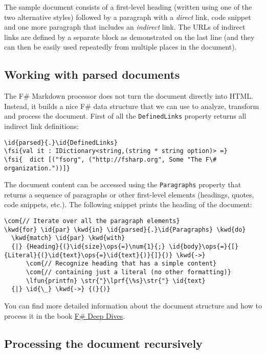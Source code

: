 \documentclass{article}
\newcommand{\id}[1]{\textcolor{black}{#1}}
\newcommand{\com}[1]{\textcolor{officegreen}{#1}}
\newcommand{\kwd}[1]{\textcolor{navy}{#1}}
\newcommand{\num}[1]{\textcolor{officegreen}{#1}}
\newcommand{\ops}[1]{\textcolor{purple}{#1}}
\newcommand{\str}[1]{\textcolor{olive}{#1}}
\newcommand{\fsi}[1]{\textcolor{outputcolor}{#1}}
\begin{document}
The sample document consists of a first-level heading (written using
one of the two alternative styles) followed by a paragraph with a
\emph{direct} link, code snippet and one more paragraph that includes an
\emph{indirect} link. The URLs of indirect links are defined by a separate
block as demonstrated on the last line (and they can then be easily used repeatedly
from multiple places in the document).
\subsection*{Working with parsed documents}



The F\# Markdown processor does not turn the document directly into HTML.
Instead, it builds a nice F\# data structure that we can use to analyze,
transform and process the document. First of all the \texttt{DefinedLinks} property
returns all indirect link definitions:
\begin{Verbatim}[commandchars=\\\{\}]
\id{parsed}{.}\id{DefinedLinks}
\fsi{val it : IDictionary<string,(string * string option)> =}
\fsi{  dict [("fsorg", ("http://fsharp.org", Some "The F\# organization."))]}
\end{Verbatim}



The document content can be accessed using the \texttt{Paragraphs} property that returns
a sequence of paragraphs or other first-level elements (headings, quotes, code snippets, etc.).
The following snippet prints the heading of the document:
\begin{Verbatim}[commandchars=\\\{\}]
\com{// Iterate over all the paragraph elements}
\kwd{for} \id{par} \kwd{in} \id{parsed}{.}\id{Paragraphs} \kwd{do}
  \kwd{match} \id{par} \kwd{with}
  {|} {Heading}{(}\id{size}\ops{=}\num{1}{;} \id{body}\ops{=}{[}{Literal}{(}\id{text}\ops{=}\id{text}{)}{]}{)} \kwd{->} 
      \com{// Recognize heading that has a simple content}
      \com{// containing just a literal (no other formatting)}
      \lfun{printfn} \str{"}\lprf{\%s}\str{"} \id{text}
  {|} \id{\_} \kwd{->} {(}{)}
\end{Verbatim}



You can find more detailed information about the document structure and how to process it
in the book \href{http://manning.com/petricek2/}{F\# Deep Dives}.
\subsection*{Processing the document recursively}
\end{document}
